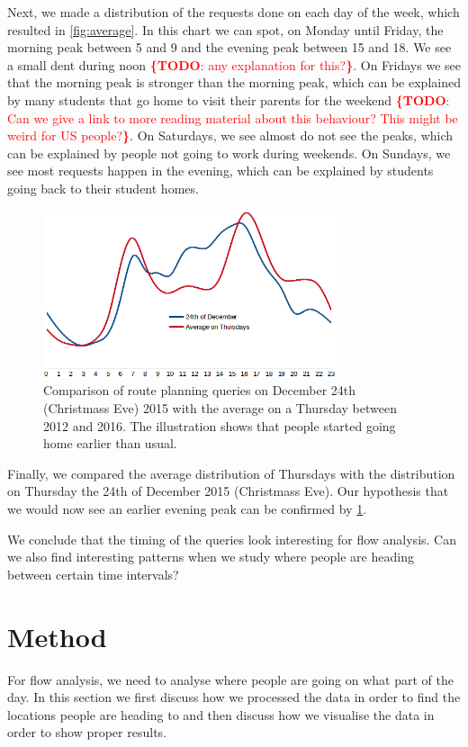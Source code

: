 \documentclass{sig-alternate}
\newcommand{\todo}[1]{\noindent\textcolor{red}{{\bf \{TODO}: #1{\bf \}}}}
\begin{document}
Next, we made a distribution of the requests done on each day of the week, which resulted in \cref{fig:average}.
In this chart we can spot, on Monday until Friday, the morning peak between 5 and 9 and the evening peak between 15 and 18.
We see a small dent during noon \todo{any explanation for this?}.
On Fridays we see that the morning peak is stronger than the morning peak, which can be explained by many students that go home to visit their parents for the weekend \todo{Can we give a link to more reading material about this behaviour? This might be weird for US people?}.
On Saturdays, we see almost do not see the peaks, which can be explained by people not going to work during weekends.
On Sundays, we see most requests happen in the evening, which can be explained by students going back to their student homes.

\begin{figure}
\centering
\includegraphics[width=8.6cm]{dec24}
\caption{Comparison of route planning queries on December 24th (Christmass Eve) 2015 with the average on a Thursday between 2012 and 2016. The illustration shows that people started going home earlier than usual.}
\label{fig:dec24}
\end{figure}

Finally, we compared the average distribution of Thursdays with the distribution on Thursday the 24th of December 2015 (Christmass Eve).
Our hypothesis that we would now see an earlier evening peak can be confirmed by \cref{fig:dec24}.

We conclude that the timing of the queries look interesting for flow analysis. 
Can we also find interesting patterns when we study where people are heading between certain time intervals?

\section{Method}
\label{sec:method}

For flow analysis, we need to analyse where people are going on what part of the day.
In this section we first discuss how we processed the data in order to find the locations people are heading to and then discuss how we visualise the data in order to show proper results.
\end{document}
